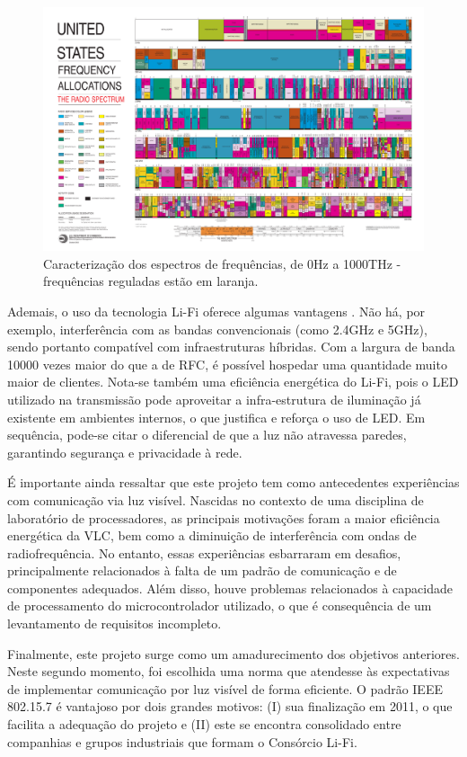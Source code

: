 	\begin{figure}[h!]
		\caption{\label{figure:intro-fcc}Caracterização dos espectros de frequências, de 0Hz a 1000THz - frequências reguladas estão em laranja.}
		\centering
		\includegraphics[width=\textwidth, trim={36.5cm 3.1cm 40cm 61cm},clip]{2003-allochrt.pdf}
	\end{figure}
	
	Ademais, o uso da tecnologia Li-Fi oferece algumas vantagens \cite{comparison-wifi}. Não há, por exemplo, interferência com as bandas convencionais (como 2.4GHz e 5GHz), sendo portanto compatível com infraestruturas híbridas. Com a largura de banda 10000 vezes maior do que a de RFC, é possível hospedar uma quantidade muito maior de clientes. Nota-se também uma eficiência energética do Li-Fi, pois o LED utilizado na transmissão pode aproveitar a infra-estrutura de iluminação já existente em ambientes internos, o que justifica e reforça o uso de LED. Em sequência, pode-se citar o diferencial de que a luz não atravessa paredes, garantindo segurança e privacidade à rede. \par
	
	É importante ainda ressaltar que este projeto tem como antecedentes experiências com comunicação via luz visível. Nascidas no contexto de uma disciplina de laboratório de processadores, as principais motivações foram a maior eficiência energética da VLC, bem como a diminuição de interferência com ondas de radiofrequência. No entanto, essas experiências esbarraram em desafios, principalmente relacionados à falta de um padrão de comunicação e de componentes adequados. Além disso, houve problemas relacionados à capacidade de processamento do microcontrolador utilizado, o que é consequência de um levantamento de requisitos incompleto.

	Finalmente, este projeto surge como um amadurecimento dos objetivos anteriores. Neste segundo momento, foi escolhida uma norma que atendesse às expectativas de implementar comunicação por luz visível de forma eficiente. O padrão IEEE 802.15.7 é vantajoso por dois grandes motivos:
	(I) sua finalização em 2011, o que facilita a adequação do projeto e (II) este se encontra consolidado entre companhias e grupos industriais que formam o Consórcio Li-Fi.
